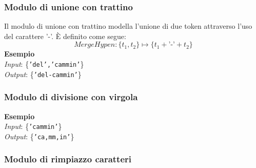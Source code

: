 \documentclass[12pt]{article}
\begin{document}
\subsubsection{Modulo di unione con trattino}
Il modulo di unione con trattino modella l'unione di due token attraverso l'uso del carattere '-'. È definito come segue:
\begin{equation}
\textit{MergeHypen}: \{ t_1,t_2 \} \mapsto \{ t_1 + \textit{'-'} + t_2 \}
\end{equation}
\textbf{Esempio}\\
\textit{Input}: \{\texttt{'del','cammin'}\}\\
\textit{Output}: \{\texttt{'del-cammin'}\}


\subsubsection{Modulo di divisione con virgola}
\textbf{Esempio}\\
\textit{Input}: \{\texttt{'cammin'}\}\\
\textit{Output}: \{\texttt{'ca,mm,in'}\}

\subsubsection{Modulo di rimpiazzo caratteri}
\end{document}
